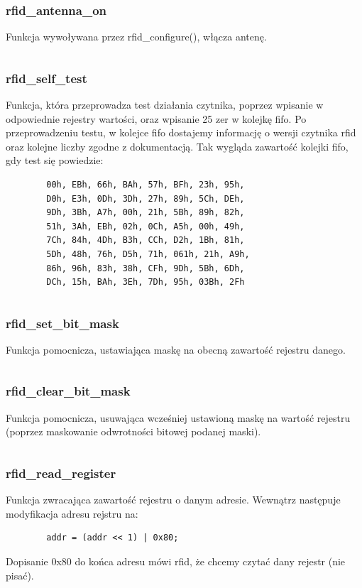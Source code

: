 \documentclass[12pt,hidelinks]{article}
\begin{document}
    \subsubsection{rfid\_antenna\_on}
    Funkcja wywoływana przez rfid\_configure(), włącza antenę.
    \inputminted[linenos=true]{c++}{rfid_code/rfid_antenna_on.c}


    \subsubsection{rfid\_self\_test}
    Funkcja, która przeprowadza test działania czytnika, poprzez wpisanie w odpowiednie rejestry wartości, oraz wpisanie 25 zer w kolejkę fifo. Po przeprowadzeniu testu, w kolejce fifo dostajemy informację o wersji czytnika rfid oraz kolejne liczby zgodne z dokumentacją. Tak wygląda zawartość kolejki fifo, gdy test się powiedzie:
    \begin{verbatim}
        00h, EBh, 66h, BAh, 57h, BFh, 23h, 95h,
        D0h, E3h, 0Dh, 3Dh, 27h, 89h, 5Ch, DEh,
        9Dh, 3Bh, A7h, 00h, 21h, 5Bh, 89h, 82h,
        51h, 3Ah, EBh, 02h, 0Ch, A5h, 00h, 49h,
        7Ch, 84h, 4Dh, B3h, CCh, D2h, 1Bh, 81h,
        5Dh, 48h, 76h, D5h, 71h, 061h, 21h, A9h,
        86h, 96h, 83h, 38h, CFh, 9Dh, 5Bh, 6Dh,
        DCh, 15h, BAh, 3Eh, 7Dh, 95h, 03Bh, 2Fh
    \end{verbatim}
    \inputminted[linenos=true]{c++}{rfid_code/rfid_self_test.c}

    \subsubsection{rfid\_set\_bit\_mask}
    Funkcja pomocnicza, ustawiająca maskę na obecną zawartość rejestru danego.
    \inputminted[linenos=true]{c++}{rfid_code/rfid_set_bit_mask.c}


    \subsubsection{rfid\_clear\_bit\_mask}
    Funkcja pomocnicza, usuwająca wcześniej ustawioną maskę na wartość rejestru (poprzez maskowanie odwrotności bitowej podanej maski).
    \inputminted[linenos=true]{c++}{rfid_code/rfid_clear_bit_mask.c}

    \subsubsection{rfid\_read\_register}
    Funkcja zwracająca zawartość rejestru o danym adresie. Wewnątrz następuje modyfikacja adresu rejstru na:
    \begin{verbatim}
        addr = (addr << 1) | 0x80;
    \end{verbatim}
    Dopisanie 0x80 do końca adresu mówi rfid, że chcemy czytać dany rejestr (nie pisać).
    \inputminted[linenos=true]{c++}{rfid_code/rfid_read_register.c}
\end{document}
